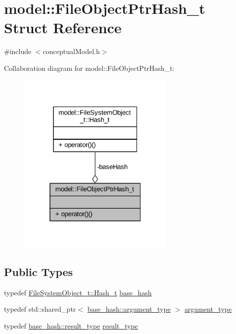\hypertarget{structmodel_1_1_file_object_ptr_hash__t}{}\section{model\+:\+:File\+Object\+Ptr\+Hash\+\_\+t Struct Reference}
\label{structmodel_1_1_file_object_ptr_hash__t}


{\ttfamily \#include $<$conceptual\+Model.\+h$>$}



Collaboration diagram for model\+:\+:File\+Object\+Ptr\+Hash\+\_\+t\+:
\nopagebreak
\begin{figure}[H]
\begin{center}
\leavevmode
\includegraphics[width=217pt]{structmodel_1_1_file_object_ptr_hash__t__coll__graph}
\end{center}
\end{figure}
\subsection*{Public Types}
\begin{DoxyCompactItemize}
\item 
typedef \hyperlink{structmodel_1_1_file_system_object__t_1_1_hash__t}{File\+System\+Object\+\_\+t\+::\+Hash\+\_\+t} \hyperlink{structmodel_1_1_file_object_ptr_hash__t_abb641cce434aefcf7af938e24f711e0c}{base\+\_\+hash}
\item 
typedef std\+::shared\+\_\+ptr$<$ \hyperlink{structmodel_1_1_file_system_object__t_1_1_hash__t_a11064641592b3b3c900a934b851c1c18}{base\+\_\+hash\+::argument\+\_\+type} $>$ \hyperlink{structmodel_1_1_file_object_ptr_hash__t_a591a96099c41cff7cd27032ba7406744}{argument\+\_\+type}
\item 
typedef \hyperlink{structmodel_1_1_file_system_object__t_1_1_hash__t_aae00910b8355e130db141d3440d01697}{base\+\_\+hash\+::result\+\_\+type} \hyperlink{structmodel_1_1_file_object_ptr_hash__t_a0d65fe59f4bccb6cdad8c6fffd050de0}{result\+\_\+type}
\end{DoxyCompactItemize}
